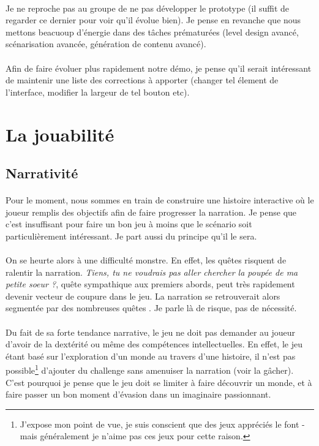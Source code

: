 \documentclass{report}
\begin{document}
\paragraph{}
Je ne reproche pas au groupe de ne pas développer le prototype (il suffit de regarder ce dernier pour voir qu'il évolue bien). Je pense en revanche que nous mettons beacuoup d'énergie dans des tâches prématurées (level design avancé, scénarisation avancée, génération de contenu avancé).

\paragraph{}
Afin de faire évoluer plus rapidement notre démo, je pense qu'il serait intéressant de maintenir une liste des corrections à apporter (changer tel élement de l'interface, modifier la largeur de tel bouton etc).

\section{La jouabilité}
\subsection{Narrativité}
\paragraph{}
Pour le moment, nous sommes en train de construire une histoire interactive où le joueur remplis des objectifs afin de faire progresser la narration.
Je pense que c'est insuffisant pour faire un bon jeu à moins que le scénario soit particulièrement intéressant. Je part aussi du principe qu'il le sera.

\paragraph{}
On se heurte alors à une difficulté monstre. En effet, les quêtes risquent de ralentir la narration. \textit{Tiens, tu ne voudrais pas aller chercher la poupée de ma petite soeur ?}, quête sympathique aux premiers abords, peut très rapidement devenir vecteur de coupure dans le jeu. La narration se retrouverait alors segmentée par des nombreuses quêtes . Je parle là de risque, pas de nécessité.

\paragraph{}
Du fait de sa forte tendance narrative, le jeu ne doit pas demander au joueur d'avoir de la dextérité ou même des compétences intellectuelles. En effet, le jeu étant basé sur l'exploration d'un monde au travers d'une histoire, il n'est pas possible\footnote{J'expose mon point de vue, je suis conscient que des jeux appréciés le font - mais généralement je n'aime pas ces jeux pour cette raison.} d'ajouter du challenge sans amenuiser la narration (voir la gâcher). C'est pourquoi je pense que le jeu doit se limiter à faire découvrir un monde, et à faire passer un bon moment d'évasion dans un imaginaire passionnant.
\end{document}
